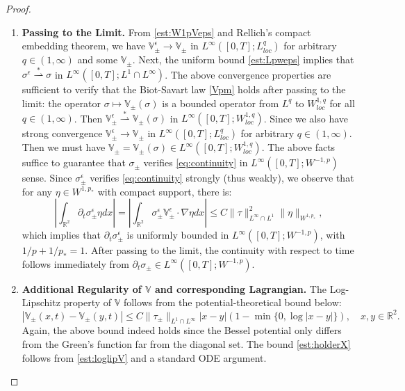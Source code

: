 \documentclass[11pt,reqno]{amsproc}
\newcommand{\pa}{\partial}
\newcommand{\la}{\label}
\newcommand{\na}{\nabla}
\newcommand{\be}{\begin{equation}}
\newcommand{\ee}{\end{equation}}
\newcommand{\eps}{\epsilon}
\newcommand{\R}{\mathbb{R}}
\newcommand{\V}{\mathbb{V}}
\begin{document}
\begin{proof}
\begin{enumerate}
    \item \textbf{Passing to the Limit.} From \eqref{est:W1pVeps} and Rellich's compact embedding theorem, we have $\V^\eps_\pm \to \V_\pm$ in $L^\infty([0,T]; L^q_{loc})$ for arbitrary $q \in (1,\infty)$ and some $\V_\pm$. Next, the uniform bound \eqref{est:Lpweps} implies that $\sigma^\eps \overset{*}{\rightharpoonup} \sigma$ in $L^\infty([0,T]; L^1\cap L^\infty)$.  %
    The above convergence properties are sufficient to verify that the Biot-Savart law \eqref{Vpm} holds after passing to the limit: the operator $\sigma \mapsto \V_\pm (\sigma)$ is a bounded operator from $L^q$ to $W^{1,q}_{loc}$ for all $q \in (1,\infty)$. Then $\V_\pm^\eps \overset{*}{\rightharpoonup} \V_\pm(\sigma)$ in $L^\infty([0,T]; W^{1,q}_{loc})$. Since we also have strong convergence $\V^\eps_\pm \to \V_\pm$ in $L^\infty([0,T]; L^q_{loc})$ for arbitrary $q \in (1,\infty)$. Then we must have $\V_\pm = \V_\pm(\sigma)\in L^\infty([0,T]; W^{1,q}_{loc})$. The above facts suffice to guarantee that $\sigma_\pm$ verifies \eqref{eq:continuity} in $L^\infty([0,T]; W^{-1,p})$ sense. 
    Since $\sigma^\eps_\pm$ verifies \eqref{eq:continuity} strongly (thus weakly), we observe that for any $\eta \in W^{1,p_*}$ with compact support, there is:
    \begin{equation}\label{est:dtsigma}
    \left|\int_{\R^2} \pa_t \sigma_{\pm}^\eps \eta dx\right| = \left|\int_{\R^2} \sigma_\pm^\eps \V_\pm^\eps \cdot \na \eta dx\right| \le C\|\tau\|_{L^\infty\cap L^1}^2 \|\eta\|_{W^{1,p_*}},
    \end{equation}
    which implies that $\pa_t \sigma_\pm^\eps$ is uniformly bounded in $L^\infty([0,T]; W^{-1,p})$, with $1/p + 1/p_* = 1$. After passing to the limit, the continuity with respect to time follows immediately from $\pa_t \sigma_\pm \in L^\infty([0,T]; W^{-1,p})$.

    \item \textbf{Additional Regularity of $\V$ and corresponding Lagrangian.} The Log-Lipschitz property of $\V$ follows from the potential-theoretical bound below:
    \be \la{est:loglipV}
        |\V_\pm(x,t) - \V_\pm (y,t)| \le C\|\tau_\pm\|_{L^1 \cap L^\infty} |x-y|(1 - \min\{0, \log|x-y|\}),\quad x,y \in \R^2.
    \ee
    Again, the above bound indeed holds since the Bessel potential only differs from the Green's function far from the diagonal set. The bound \eqref{est:holderX} follows from \eqref{est:loglipV} and a standard ODE argument.


\end{enumerate}
\end{proof}
\end{document}
